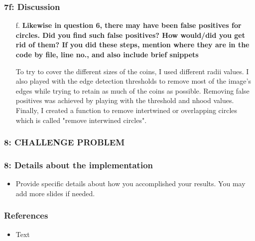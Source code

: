     \begin{frame}[t]
		\frametitle{7f: Discussion}
		
		\begin{normalsize}
			\begin{itemize}
				\setlength\itemsep{1em}
				
				\item[f.] \textbf{Likewise in question 6, there may have been false positives for circles.  Did you find such false positives? How would/did you get rid of them?  If you did these steps, mention where they are in the code by file, line no., and also include brief snippets}

				\item[] To try to cover the different sizes of the coins, I used different radii values. I also played with the edge detection thresholds to remove most of the image's edges while trying to retain as much of the coins as possible. Removing false positives was achieved by playing with the threshold and nhood values. Finally, I created a function to remove intertwined or overlapping circles which is called "remove interwined circles".
				
			\end{itemize}
		\end{normalsize}
		
	\end{frame}
    
    \begin{frame}
		\frametitle{8: CHALLENGE PROBLEM}
		
		\begin{figure}[!htb]
		\end{figure}	
		
	\end{frame}
    
    \begin{frame}[t]
		\frametitle{8: Details about the implementation}
		
		\begin{Large}
			\begin{itemize}
				\setlength\itemsep{1em}

				\item Provide specific details about how you accomplished your results. You may add more slides if needed.
				
			\end{itemize}
		\end{Large}
		
	\end{frame}
    
    \begin{frame}[t]
		\frametitle{References}
		
		\begin{Large}
			\begin{itemize}
				\setlength\itemsep{1em}

				\item Text
				
			\end{itemize}
		\end{Large}
		
	\end{frame}
	
